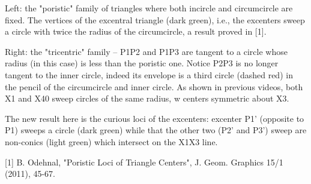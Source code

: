 Left: the "poristic" family of triangles where both incircle and circumcircle are fixed. The vertices of the excentral triangle (dark green), i.e., the excenters sweep a circle with twice the radius of the circumcircle, a result proved in [1].

Right: the "tricentric" family -- P1P2 and P1P3 are tangent to a circle whose radius (in this case) is less than the poristic one. Notice P2P3 is no longer tangent to the inner circle, indeed its envelope is a third circle (dashed red) in the pencil of the circumcircle and inner circle. As shown in previous videos, both X1 and X40 sweep circles of the same radius, w centers symmetric about X3.

The new result here is the curious loci of the excenters: excenter P1' (opposite to P1) sweeps a circle (dark green) while that the other two (P2' and P3') sweep are non-conics (light green) which intersect on the X1X3 line.  

[1] B. Odehnal, "Poristic Loci of Triangle Centers", J. Geom. Graphics 15/1 (2011), 45-67.